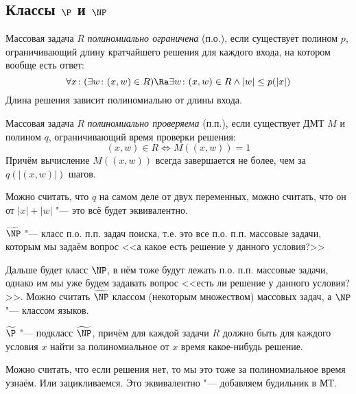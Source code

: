 \subsection{Классы $\P$ и $\NP$}
	\begin{Def}
		Массовая задача $R$ \textit{полиномиально ограничена} (п.о.), если существует полином $p$, ограничивающий длину кратчайшего решения для каждого входа,
		на котором вообще есть ответ:
		\[
			\forall x \colon (\exists w \colon (x, w) \in R) \Ra \exists w \colon (x, w) \in R \land |w| \le p(|x|)
		\]
		Длина решения зависит полиномиально от длины входа.
	\end{Def}
	\begin{Def}
		Массовая задача $R$ \textit{полиномиально проверяема} (п.п.), если существует ДМТ $M$ и полином $q$, ограничивающий время проверки решения:
		\[
			(x, w) \in R \iff M((x, w))=1
		\]
		Причём вычисление $M((x, w))$ всегда завершается не более, чем за $q(|(x, w)|)$ шагов.
	\end{Def}
	\begin{Rem}
		Можно считать, что $q$ на самом деле от двух переменных, можно считать, что он от $|x|+|w|$ "--- это всё будет эквивалентно.
	\end{Rem}

	\begin{Def}
		$\widetilde{\NP}$ "--- класс п.о. п.п. задач поиска, т.е. это все п.о. п.п. массовые задачи, которым мы задаём вопрос <<а какое есть решение у данного условия?>>
	\end{Def}
	\begin{Rem}
		Дальше будет класс $\NP$, в нём тоже будут лежать п.о. п.п. массовые задачи, однако им мы уже будем задавать вопрос <<есть ли решение у данного условия?>>.
		Можно считать $\widetilde{\NP}$ классом (некоторым множеством) массовых задач, а $\NP$ "--- классом языков.
	\end{Rem}

	\begin{Def}
		$\widetilde{\P}$ "--- подкласс $\widetilde{\NP}$, причём для каждой задачи $R$ должно быть для каждого условия $x$ найти за полиномиальное от $x$ время какое-нибудь решение.
	\end{Def}
	\begin{Rem}
		Можно считать, что если решения нет, то мы это тоже за полиномиальное время узнаём.
		Или зацикливаемся.
		Это эквивалентно "--- добавляем будильник в МТ.
	\end{Rem}

